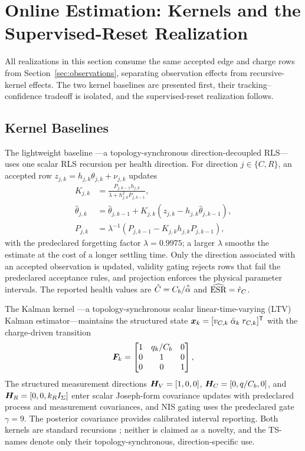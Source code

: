 \section{Online Estimation: Kernels and the Supervised-Reset Realization}
\label{sec:estimators}

All realizations in this section consume the same accepted edge and charge rows from Section~\ref{sec:observations}, separating observation effects from recursive-kernel effects. The two kernel baselines are presented first, their tracking--confidence tradeoff is isolated, and the supervised-reset realization follows.

\subsection{Kernel Baselines}
\label{sec:kernels}

The lightweight baseline \TSRLS{}---a topology-synchronous direction-decoupled RLS---uses one scalar RLS recursion per health direction. For direction $j\in\{C,R\}$, an accepted row $z_{j,k}=h_{j,k}\theta_{j,k}+\nu_{j,k}$ updates
\begin{align}
K_{j,k}&=\frac{P_{j,k-1}h_{j,k}}
{\lambda+h_{j,k}^{2}P_{j,k-1}},
\label{eq:rls_gain}\\
\hat\theta_{j,k}&=\hat\theta_{j,k-1}
+K_{j,k}(z_{j,k}-h_{j,k}\hat\theta_{j,k-1}),
\label{eq:rls_state}\\
P_{j,k}&=\lambda^{-1}(P_{j,k-1}-K_{j,k}h_{j,k}P_{j,k-1}),
\label{eq:rls_cov}
\end{align}
with the predeclared forgetting factor $\lambda=0.9975$; a larger $\lambda$ smooths the estimate at the cost of a longer settling time. Only the direction associated with an accepted observation is updated, validity gating rejects rows that fail the predeclared acceptance rules, and projection enforces the physical parameter intervals. The reported health values are $\hat C=C_b/\hat{\bar{\alpha}}$ and $\widehat{\mathrm{ESR}}=\hat r_C$.

The Kalman kernel \TSKF{}---a topology-synchronous scalar linear-time-varying (LTV) Kalman estimator---maintains the structured state $\bm{x}_k=[v_{C,k}\;\bar{\alpha}_k\;r_{C,k}]^{\mathsf T}$ with the charge-driven transition
\begin{equation}
\bm{F}_k=
\begin{bmatrix}
1&q_k/C_b&0\\0&1&0\\0&0&1
\end{bmatrix},
\label{eq:kf_transition}
\end{equation}
The structured measurement directions $\bm{H}_V=[1,0,0]$, $\bm{H}_C=[0,q/C_b,0]$, and $\bm{H}_R=[0,0,k_RI_\Sigma]$ enter scalar Joseph-form covariance updates with predeclared process and measurement covariances, and NIS gating uses the predeclared gate $\gamma=9$. The posterior covariance provides calibrated interval reporting. Both kernels are standard recursions \cite{jazwinski1970filtering,anderson1979optimal}; neither is claimed as a novelty, and the TS- names denote only their topology-synchronous, direction-specific use.


